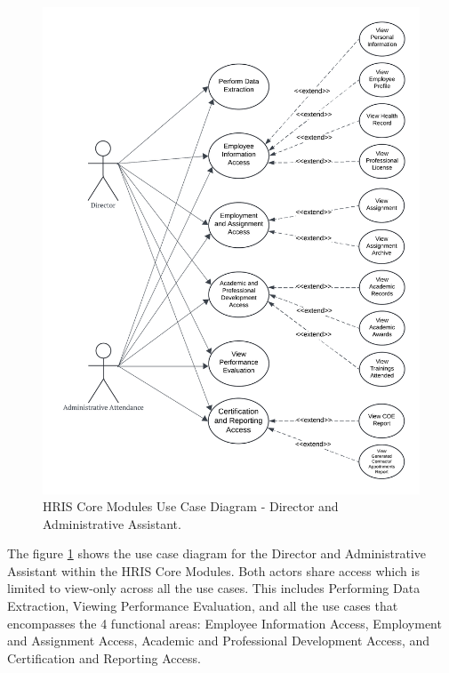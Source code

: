     \begin{figure}[H] 
        \centering
        \includegraphics[width=0.9\linewidth]{figures/images/diagrams/usecase/use-case-basic-3.png}
        \caption{HRIS Core Modules Use Case Diagram - Director and Administrative Assistant.}
        \label{fig:use-case-basic-3}
    \end{figure}

    The figure \ref{fig:use-case-basic-3} shows the use case diagram for the Director and Administrative Assistant within the HRIS Core Modules. Both actors share access which is limited to view-only across all the use cases. This includes Performing Data Extraction, Viewing Performance Evaluation, and all the use cases that encompasses the 4 functional areas: Employee Information Access, Employment and Assignment Access, Academic and Professional Development Access, and Certification and Reporting Access. 

